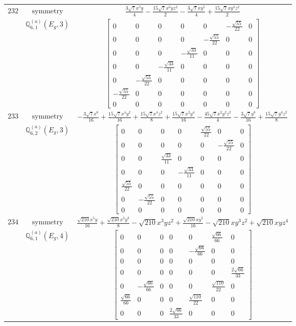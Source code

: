 \documentclass[fleqn,8pt,landscape]{jsarticle}
\begin{document}
\begin{longtable}{ccc}
$ 232 $ & $ \text{symmetry} $ & $ \frac{3 \sqrt{7} x^{5} y}{4} - \frac{15 \sqrt{7} x^{3} y z^{2}}{2} - \frac{3 \sqrt{7} x y^{5}}{4} + \frac{15 \sqrt{7} x y^{3} z^{2}}{2} $ \\
$  $ & $ \mathbb{Q}_{6,1}^{(a)}(E_{g},3) $ & $ \begin{bmatrix} 0 & 0 & 0 & 0 & 0 & - \frac{\sqrt{55}}{22} & 0 \\ 0 & 0 & 0 & 0 & - \frac{\sqrt{55}}{22} & 0 & 0 \\ 0 & 0 & 0 & - \frac{\sqrt{33}}{11} & 0 & 0 & 0 \\ 0 & 0 & - \frac{\sqrt{33}}{11} & 0 & 0 & 0 & 0 \\ 0 & - \frac{\sqrt{55}}{22} & 0 & 0 & 0 & 0 & 0 \\ - \frac{\sqrt{55}}{22} & 0 & 0 & 0 & 0 & 0 & 0 \\ 0 & 0 & 0 & 0 & 0 & 0 & 0 \end{bmatrix} $ \\ \hline
$ 233 $ & $ \text{symmetry} $ & $ - \frac{3 \sqrt{7} x^{6}}{16} + \frac{15 \sqrt{7} x^{4} y^{2}}{16} + \frac{15 \sqrt{7} x^{4} z^{2}}{8} + \frac{15 \sqrt{7} x^{2} y^{4}}{16} - \frac{45 \sqrt{7} x^{2} y^{2} z^{2}}{4} - \frac{3 \sqrt{7} y^{6}}{16} + \frac{15 \sqrt{7} y^{4} z^{2}}{8} $ \\
$  $ & $ \mathbb{Q}_{6,2}^{(a)}(E_{g},3) $ & $ \begin{bmatrix} 0 & 0 & 0 & 0 & \frac{\sqrt{55}}{22} & 0 & 0 \\ 0 & 0 & 0 & 0 & 0 & - \frac{\sqrt{55}}{22} & 0 \\ 0 & 0 & \frac{\sqrt{33}}{11} & 0 & 0 & 0 & 0 \\ 0 & 0 & 0 & - \frac{\sqrt{33}}{11} & 0 & 0 & 0 \\ \frac{\sqrt{55}}{22} & 0 & 0 & 0 & 0 & 0 & 0 \\ 0 & - \frac{\sqrt{55}}{22} & 0 & 0 & 0 & 0 & 0 \\ 0 & 0 & 0 & 0 & 0 & 0 & 0 \end{bmatrix} $ \\ \hline
$ 234 $ & $ \text{symmetry} $ & $ \frac{\sqrt{210} x^{5} y}{16} + \frac{\sqrt{210} x^{3} y^{3}}{8} - \sqrt{210} x^{3} y z^{2} + \frac{\sqrt{210} x y^{5}}{16} - \sqrt{210} x y^{3} z^{2} + \sqrt{210} x y z^{4} $ \\
$  $ & $ \mathbb{Q}_{6,1}^{(a)}(E_{g},4) $ & $ \begin{bmatrix} 0 & 0 & 0 & 0 & 0 & \frac{\sqrt{66}}{66} & 0 \\ 0 & 0 & 0 & 0 & - \frac{\sqrt{66}}{66} & 0 & 0 \\ 0 & 0 & 0 & 0 & 0 & 0 & 0 \\ 0 & 0 & 0 & 0 & 0 & 0 & \frac{2 \sqrt{66}}{33} \\ 0 & - \frac{\sqrt{66}}{66} & 0 & 0 & 0 & \frac{\sqrt{110}}{22} & 0 \\ \frac{\sqrt{66}}{66} & 0 & 0 & 0 & \frac{\sqrt{110}}{22} & 0 & 0 \\ 0 & 0 & 0 & \frac{2 \sqrt{66}}{33} & 0 & 0 & 0 \end{bmatrix} $ \\ \hline

\end{longtable}
\end{document}
